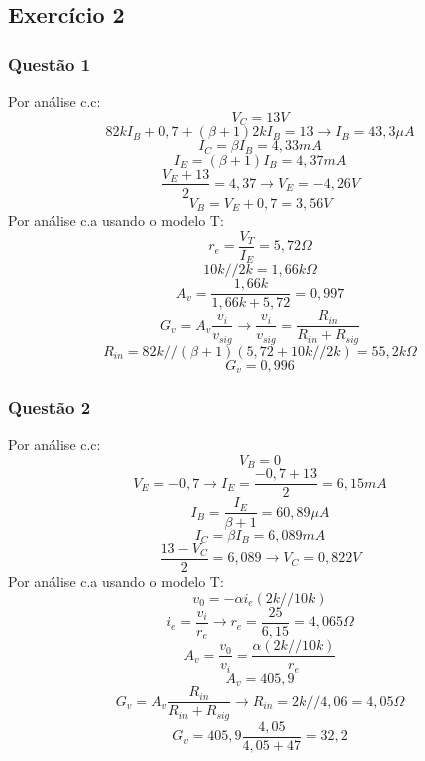 \documentclass[journal, a4paper]{IEEEtran}
\begin{document}
        \subsection{Exercício 2}
            \subsubsection{Questão 1} 
                Por análise c.c:
                $$V_C = 13V$$
                $$82kI_B + 0,7 + (\beta +1)2kI_B= 13 \xrightarrow{} I_B=43,3\mu A$$
                $$I_C = \beta I_B = 4,33mA$$
                $$I_E = (\beta +1)I_B = 4,37mA$$
                $$\frac{V_E + 13}{2} = 4,37 \xrightarrow{} V_E = -4,26V$$
                $$V_B = V_E + 0,7 = 3,56V$$
                Por análise c.a usando o modelo T:
                $$r_e = \frac{V_T}{I_E} = 5,72 \Omega$$
                $$10k//2k = 1,66k\Omega$$
                $$A_v = \frac{1,66k}{1,66k + 5,72} = 0,997$$
                $$G_v = A_v \frac{v_i}{v_{sig}} \xrightarrow{} \frac{v_i}{v_{sig}} = \frac{R_{in}}{R_{in} + R_{sig}}$$
                $$R_{in} = 82k//(\beta +1)(5,72 + 10k//2k) = 55,2k\Omega$$
                $$G_v = 0,996$$
            \subsubsection{Questão 2}
                Por análise c.c:
                $$V_B = 0$$
                $$V_E = -0,7 \xrightarrow{} I_E = \frac{-0,7 + 13}{2} = 6,15mA$$
                $$I_B = \frac{I_E}{\beta +1} = 60,89 \mu A$$
                $$I_C = \beta I_B = 6,089 mA$$
                $$\frac{13-V_C}{2}=6,089 \xrightarrow {}V_C = 0,822 V$$
                Por análise c.a usando o modelo T:
                $$v_0 = - \alpha i_e (2k // 10k)$$
                $$i_e = \frac{v_i}{r_e} \xrightarrow{} r_e = \frac{25}{6,15} = 4,065 \Omega$$
                $$A_v = \frac{v_0}{v_i} = \frac{\alpha (2k//10k)}{r_e}$$
                $$A_v = 405,9$$
                $$G_v = A_v \frac{R_{in}}{R_{in}+R_{sig}} \xrightarrow{} R_{in} = 2k//4,06 = 4,05\Omega$$
                $$G_v = 405,9\frac{4,05}{4,05 + 47} = 32,2$$
\end{document}
